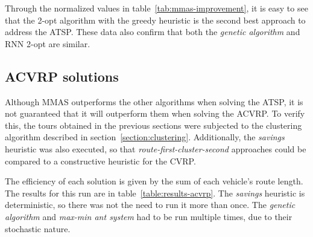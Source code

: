 Through the normalized values in table~\ref{tab:mmas-improvement}, it is easy to
see that the 2-opt algorithm with the greedy heuristic is the second best
approach to address the ATSP. These data also confirm that both the
\textit{genetic algorithm} and RNN 2-opt are similar.

\subsection{ACVRP solutions}
\label{section:large-atsp}

Although MMAS outperforms the other algorithms when solving the ATSP, it is not
guaranteed that it will outperform them when solving the ACVRP. To verify this,
the tours obtained in the previous sections were subjected to the clustering
algorithm described in section~\ref{section:clustering}. Additionally, the
\textit{savings} heuristic was also executed, so that
\textit{route-first-cluster-second} approaches could be compared to a
constructive heuristic for the CVRP.

The efficiency of each solution is given by the sum of each vehicle's route
length. The results for this run are in table~\ref{table:results-acvrp}. The
\textit{savings} heuristic is deterministic, so there was not the need to run it
more than once. The \textit{genetic algorithm} and \textit{max-min ant system}
had to be run multiple times, due to their stochastic nature.

